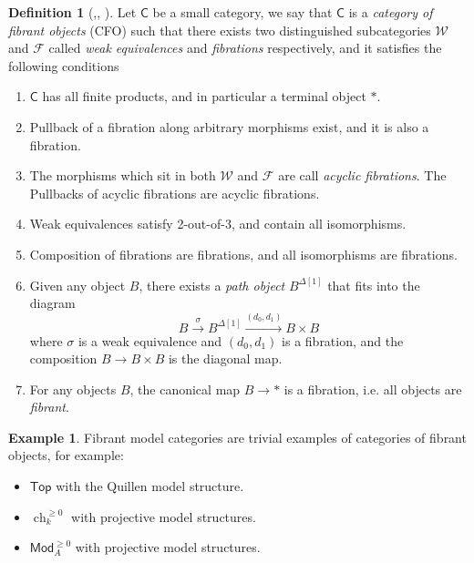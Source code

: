 \documentclass[12pt]{amsart}
\theoremstyle{definition}
\newtheorem{example}[thm]{Example}
\newtheorem{defn}[thm]{Definition}
\theoremstyle{remark}
\numberwithin{equation}{section}
\newcommand{\CC}{{\mathsf C}}
\newcommand{\1}{{\mathbb{1}}}
\newcommand{\Mod}{\mathsf{Mod}}
\newcommand{\Top}{\mathsf{Top}}
\newcommand{\ch}{\operatorname{ch}}
\begin{document}
\begin{defn}[\cite{Bro73},\cite{BG17}, \cite{RZ20}]

Let $\CC$ be a small category, we say that $\CC$ is a {\it category of fibrant objects} (CFO) such that there exists two distinguished subcategories $\mathcal{W}$ and $\mathcal{F}$ called {\it weak equivalences} and {\it fibrations} respectively, and it satisfies the following conditions

\begin{enumerate}
	\item $\CC$ has all finite products, and in particular a terminal object $\ast$.
	\item Pullback of a fibration along arbitrary morphisms exist, and it is also a fibration.
	
	\item The morphisms which sit in both $\mathcal{W}$ and $\mathcal{F}$ are call {\it acyclic fibrations}. The Pullbacks of acyclic fibrations are acyclic fibrations.
	\item  Weak equivalences satisfy 2-out-of-3, and contain all isomorphisms.
	\item  Composition of fibrations are fibrations, and all isomorphisms are fibrations.
	\item Given any object $B$, there exists a {\it path object} $B^{\Delta[1]}$ that fits into the diagram
	\begin{equation*}
	B\stackrel{\sigma}{\longrightarrow} B^{\Delta[1]} \stackrel{(d_0, d_1)}{\longrightarrow} B \times B
	\end{equation*}
	where $\sigma$ is a weak equivalence and $(d_0, d_1)$ is a fibration, and the composition $B\to B\times B$ is the diagonal map. 
	\item For any objects $B$, the canonical map $B \to \ast$ is a fibration, i.e. all objects are {\it fibrant}.
\end{enumerate}

\end{defn}
\begin{example}
    Fibrant model categories are trivial examples of categories of fibrant objects, for example:
    \begin{itemize}
        \item $\Top$ with the  Quillen model structure.
        \item $\ch_k^{\ge 0}$ with projective model structures.
        \item $\Mod_A^{\ge 0}$ with projective model structures.
    \end{itemize}
\end{example}
\end{document}
